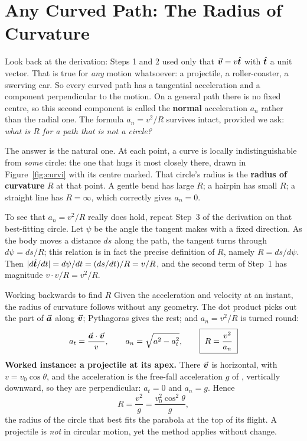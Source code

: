 \section{Any Curved Path: The Radius of Curvature}\label{sec:curvature}

Look back at the derivation: Steps 1 and 2 used only that $\vec{\bm{v}}=v\hat{\bm{t}}$ with $\hat{\bm{t}}$ a unit vector.
That is true for \emph{any} motion whatsoever: a projectile, a roller-coaster, a swerving car. So
every curved path has a tangential acceleration and a component perpendicular to the motion. On a
general path there is no fixed centre, so this second component is called the \textbf{normal}
acceleration $a_n$ rather than the radial one. The formula $a_n=v^{2}/R$ survives intact, provided we
ask: \emph{what is $R$ for a path that is not a circle?}

The answer is the natural one. At each point, a curve is locally indistinguishable from \emph{some}
circle: the one that hugs it most closely there, drawn in Figure~\ref{fig:curvi} with its centre marked. That circle's radius is the \textbf{radius of
curvature} $R$ at that point. A gentle bend has large $R$; a hairpin has small $R$; a straight line has
$R=\infty$, which correctly gives $a_n=0$.

To see that $a_n=v^{2}/R$ really does hold, repeat Step~3 of the derivation on that best-fitting circle.
Let $\psi$ be the angle the tangent makes with a fixed direction. As the body moves a distance $ds$ along
the path, the tangent turns through $d\psi=ds/R$; this relation is in fact the precise definition of
$R$, namely $R=ds/d\psi$. Then $|d\hat{\bm{t}}/dt|=d\psi/dt=(ds/dt)/R=v/R$, and the second term of Step~1 has
magnitude $v\cdot v/R=v^{2}/R$.


\begin{figure}[htbp]
\centering
{}
\end{figure}

\begin{methodbox}{Working backwards to find $R$}
Given the acceleration and velocity at an instant, the radius of curvature follows without any geometry.
The dot product picks out the part of $\vec{\bm{a}}$ along $\vec{\bm{v}}$; Pythagoras gives the rest; and $a_n=v^2/R$
is turned round:
\[
a_t=\frac{\vec{\bm{a}}\cdot\vec{\bm{v}}}{v},\qquad
a_n=\sqrt{a^{2}-a_t^{2}},\qquad
\boxed{\;R=\frac{v^{2}}{a_n}\;}
\]
\textbf{Worked instance: a projectile at its apex.} There $\vec{\bm{v}}$ is horizontal, with $v=v_0\cos\theta$, and
the acceleration is the free-fall acceleration $g$ of , vertically downward, so they are perpendicular: $a_t=0$ and $a_n=g$. Hence
\[
R=\frac{v^{2}}{g}=\frac{v_0^{2}\cos^{2}\theta}{g},
\]
the radius of the circle that best fits the parabola at the top of its flight. A projectile is
\emph{not} in circular motion, yet the method applies without change.
\end{methodbox}

